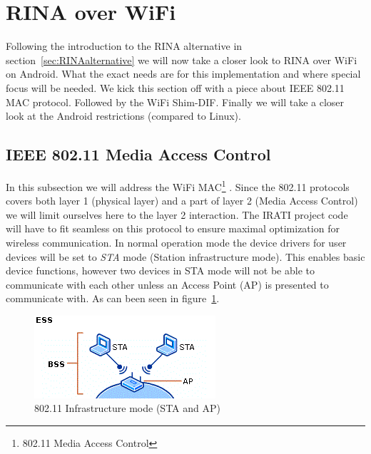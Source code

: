 \section{RINA over WiFi}

Following the introduction to the RINA alternative in section~\ref{sec:RINAalternative} we will now take a closer look to RINA over WiFi on Android. What the exact needs are for this implementation and where special focus will be needed. We kick this section off with a piece about IEEE 802.11 MAC protocol. Followed by the WiFi Shim-DIF. Finally we will take a closer look at the Android restrictions (compared to Linux).

\subsection{IEEE 802.11 Media Access Control}

In this subsection we will address the WiFi MAC\footnote{802.11 Media Access Control} \citep{matthewgast2005}. Since the 802.11 protocols covers both layer 1 (physical layer) and a part of layer 2 (Media Access Control) we will limit ourselves here to the layer 2 interaction. The IRATI project code will have to fit seamless on this protocol to ensure maximal optimization for wireless communication. In normal operation mode the device drivers for user devices will be set to \emph{STA} mode (Station infrastructure mode). This enables basic device functions, however two devices in STA mode will not be able to communicate with each other unless an Access Point (AP) is presented to communicate with. As can been seen in figure~\ref{fig:80211inframode}.

\begin{figure}[H]
    \centering
    \includegraphics{figures/80211inframode}
    \caption{802.11 Infrastructure mode (STA and AP) \citep{website:80211microsoft}} 
    \label{fig:80211inframode}
\end{figure}

\npar

